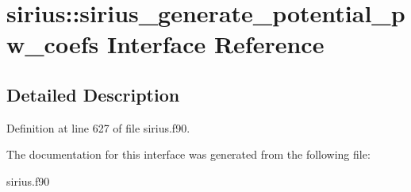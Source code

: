 \hypertarget{interfacesirius_1_1sirius__generate__potential__pw__coefs}{}\section{sirius\+:\+:sirius\+\_\+generate\+\_\+potential\+\_\+pw\+\_\+coefs Interface Reference}
\label{interfacesirius_1_1sirius__generate__potential__pw__coefs}


\subsection{Detailed Description}


Definition at line 627 of file sirius.\+f90.



The documentation for this interface was generated from the following file\+:\begin{DoxyCompactItemize}
\item 
sirius.\+f90\end{DoxyCompactItemize}
